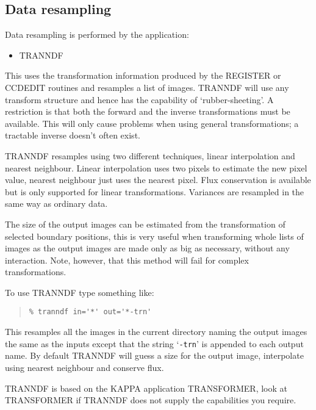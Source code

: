 \documentclass[twoside,11pt]{article}
\newcommand{\htmlref}[2]{#1}
\newcommand{\xref}[3]{#1}
\renewcommand{\_}{\texttt{\symbol{95}}}
\newenvironment{myquote}{\begin{quote}\begin{small}}{\end{small}\end{quote}}
\newcommand{\text}[1]{{\small \tt #1}}
\newcommand{\routine}[1]{{\sc #1}}
\newcommand{\xroutine}[1]{\htmlref{{\sc #1}}{#1}}
\begin{document}
\subsection{Data resampling}
Data resampling is performed by the application:
\begin{itemize}
\item \routine{TRANNDF}
\end{itemize}
This uses the transformation information produced by the \xroutine{REGISTER} or
\xroutine{CCDEDIT} routines and resamples a list of images. \routine{TRANNDF} will use any
transform structure and hence has the capability of `rubber-sheeting'.
A restriction is that both the forward and the inverse transformations
must be available. This will only cause problems when using general
transformations; a tractable inverse doesn't often exist.

\routine{TRANNDF} resamples using two different techniques, linear interpolation
and nearest neighbour. Linear interpolation uses two pixels to estimate
the new pixel value, nearest neighbour just uses the nearest pixel. Flux
conservation is available but is only supported for linear
transformations. Variances are resampled in the same way as ordinary
data.

The size of the output images can be estimated from the transformation of
selected boundary positions, this is very useful when transforming whole
lists of images as the output images are made only as big as necessary,
without any interaction. Note, however, that this method will fail for
complex transformations.

To use \routine{TRANNDF} type something like:
\begin{myquote}
\begin{verbatim}
% tranndf in='*' out='*-trn'
\end{verbatim}
\end{myquote}
This resamples all the images in the current directory naming the output
images the same as the inputs except that the string `\text{-trn}' is
appended to each output name. By default \routine{TRANNDF} will guess a size for
the output image, interpolate using nearest neighbour and conserve flux.

\routine{TRANNDF} is based on the KAPPA application
\xref{TRANSFORMER}{sun95}{TRANSFORMER}, look at
TRANSFORMER if \routine{TRANNDF} does not supply the capabilities you require.
\end{document}
